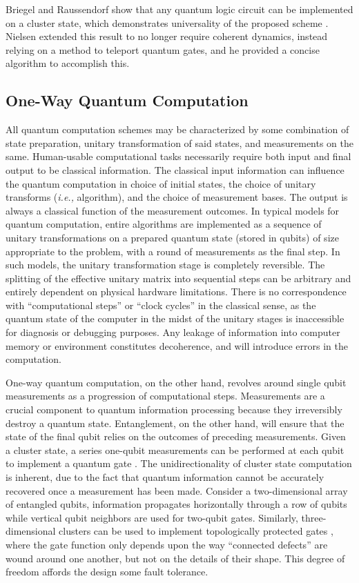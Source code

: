 \documentclass[twocolumn]{Styles/IEEEtran11}
\newcommand{\ie}{{\it i.e., }}
\begin{document}
Briegel and Raussendorf show that any quantum logic circuit can be implemented on a cluster state, which demonstrates universality of the proposed scheme \cite{briegel2000measurements}. Nielsen \cite{nielsen108020universal} extended this result to no longer require coherent dynamics, instead relying on a method to teleport quantum gates, and he provided a concise algorithm to accomplish this. 

\subsection{One-Way Quantum Computation}
All quantum computation schemes may be characterized by some combination of state preparation, unitary transformation of said states, and measurements on the same. Human-usable computational tasks necessarily require both input and final output to be classical information. The classical input information can influence the quantum computation in choice of initial states, the choice of unitary transforms (\ie algorithm), and the choice of measurement bases. The output is always a classical function of the measurement outcomes. In typical models for quantum computation, entire algorithms are implemented as a sequence of unitary transformations on a prepared quantum state (stored in qubits) of size appropriate to the problem, with a round of measurements as the final step. In such models, the unitary transformation stage is completely reversible. The splitting of the effective unitary matrix into sequential steps can be arbitrary and entirely dependent on physical hardware limitations. There is no correspondence with ``computational steps'' or ``clock cycles'' in the classical sense, as the quantum state of the computer in the midst of the unitary stages is inaccessible for diagnosis or debugging purposes. Any leakage of information into computer memory or environment constitutes decoherence, and will introduce errors in the computation.


One-way quantum computation, on the other hand, revolves around single qubit measurements as a progression of computational steps. Measurements are a crucial component to quantum information processing because they irreversibly destroy a quantum state. Entanglement, on the other hand, will ensure that the state of the final qubit relies on the outcomes of preceding measurements. Given a cluster state, a series one-qubit measurements can be performed at each qubit to implement a quantum gate \cite{jorrand2005unifying}.  The unidirectionality of cluster state computation is inherent, due to the fact that quantum information cannot be accurately recovered once a measurement has been made. Consider a two-dimensional array of entangled qubits, information propagates horizontally through a row of qubits while vertical qubit neighbors are used for two-qubit gates. Similarly, three-dimensional clusters can be used to implement topologically protected gates \cite{raussendorf2007topological}, where the gate function only depends upon the way ``connected defects'' are wound around one another, but not on the details of their shape. This degree of freedom affords the design some fault tolerance.
\end{document}
